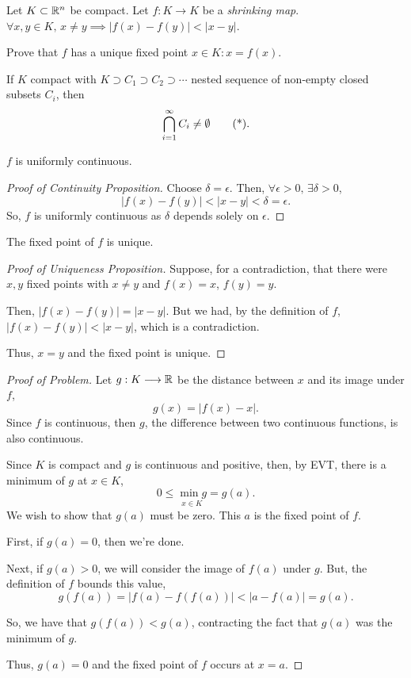 \documentclass[../9extra]{subfiles}
\begin{document}
\begin{problem}[1]
Let $K\subset \mathbb{R}^{n}$ be compact.
Let $f:K\longrightarrow K$ be a \textit{shrinking map}.
$\forall x,y \in K,\, x \neq y \implies |f(x)-f(y)| < |x-y|$.

Prove that $f$ has a unique fixed point  $x \in K : x = f(x)$.
\end{problem}

If $K$ compact with  $K \supset C_1 \supset C_2 \supset \cdots$ nested sequence of non-empty closed subsets $C_i$, then \[
	\bigcap_{i=1}^{\infty} C_i \neq \emptyset \tag{*}
	.\]

\begin{proposition}
	$f$ is uniformly continuous.
\end{proposition}
\begin{proof}[Proof of Continuity Proposition]
	Choose $\delta = \epsilon$.
	Then, $\forall \epsilon>0,\, \exists \delta>0$, \[
		|f(x)-f(y)| < |x-y| < \delta = \epsilon
		.\]
	So, $f$ is uniformly continuous as  $\delta$ depends solely on  $\epsilon$.
\end{proof}

\begin{proposition}
	The fixed point of $f$ is unique.
\end{proposition}
\begin{proof}[Proof of Uniqueness Proposition]
	Suppose, for a contradiction, that there were $x,y$ fixed points with  $x \neq y$
	and $f(x)=x$,  $f(y)=y$.

	Then,  $|f(x)-f(y)| = |x-y|$.
	But we had, by the definition of  $f$, $|f(x)-f(y)| < |x-y|$, which is a contradiction.

	Thus, $x=y$ and the fixed point is unique.
\end{proof}

\begin{proof}[Proof of Problem]
	Let $g : K \longrightarrow \mathbb{R}$ be the distance between $x$ and its image under $f$, \[
		g(x)= |f(x)-x|
		.\]
	Since $f$ is continuous, then $g$, the difference between two continuous functions, is also continuous.

	Since  $K$ is compact and  $g$ is continuous and positive, then, by EVT, there is a minimum of $g$ at $x \in K$, \[
		0\le \underset{x \in K}{\min{g}} = g(a)
		.\]
	We wish to show that $g(a)$ must be zero.
	This $a$ is the fixed point of $f$.

	First, if $g(a)=0$, then we're done.

	Next, if  $g(a)>0$, we will consider the image of $f(a)$ under $g$.
	But, the definition of $f$ bounds this value, \[
		g(f(a))=|f(a)-f(f(a))| < |a - f(a)| = g(a)
		.\]

	So, we have that $g(f(a))<g(a)$, contracting the fact that $g(a)$ was the minimum of  $g$.

	Thus,  $g(a)=0$ and the fixed point of  $f$ occurs at  $x=a$.
\end{proof}
\end{document}
